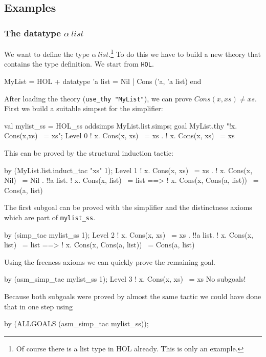 \subsection{Examples}

\subsubsection{The datatype $\alpha~list$}

We want to define the type $\alpha~list$.\footnote{Of course there is a list
  type in HOL already. This is only an example.} To do this we have to build
a new theory that contains the type definition. We start from {\tt HOL}.
\begin{ttbox}
MyList = HOL +
  datatype 'a list = Nil | Cons ('a, 'a list)
end
\end{ttbox}
After loading the theory (\verb$use_thy "MyList"$), we can prove
$Cons(x,xs)\neq xs$.  First we build a suitable simpset for the simplifier:
\begin{ttbox}
val mylist_ss = HOL_ss addsimps MyList.list.simps;
goal MyList.thy "!x. Cons(x,xs) ~= xs";
{\out Level 0}
{\out ! x. Cons(x, xs) ~= xs}
{. ! x. Cons(x, xs) ~= xs}
\end{ttbox}
This can be proved by the structural induction tactic:
\begin{ttbox}
by (MyList.list.induct_tac "xs" 1);
{\out Level 1}
{\out ! x. Cons(x, xs) ~= xs}
{. ! x. Cons(x, Nil) ~= Nil}
{. !!a list.}
{\out        ! x. Cons(x, list) ~= list ==>}
{\out        ! x. Cons(x, Cons(a, list)) ~= Cons(a, list)}
\end{ttbox}
The first subgoal can be proved with the simplifier and the distinctness
axioms which are part of \verb$mylist_ss$.
\begin{ttbox}
by (simp_tac mylist_ss 1);
{\out Level 2}
{\out ! x. Cons(x, xs) ~= xs}
{. !!a list.}
{\out        ! x. Cons(x, list) ~= list ==>}
{\out        ! x. Cons(x, Cons(a, list)) ~= Cons(a, list)}
\end{ttbox}
Using the freeness axioms we can quickly prove the remaining goal.
\begin{ttbox}
by (asm_simp_tac mylist_ss 1);
{\out Level 3}
{\out ! x. Cons(x, xs) ~= xs}
{\out No subgoals!}
\end{ttbox}
Because both subgoals were proved by almost the same tactic we could have
done that in one step using
\begin{ttbox}
by (ALLGOALS (asm_simp_tac mylist_ss));
\end{ttbox}


